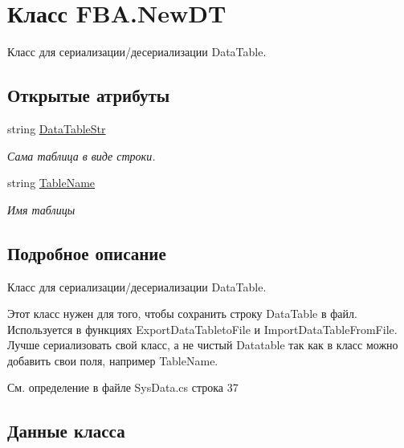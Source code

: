 \hypertarget{class_f_b_a_1_1_new_d_t}{}\section{Класс F\+B\+A.\+New\+DT}
\label{class_f_b_a_1_1_new_d_t}


Класс для сериализации/десериализации Data\+Table.  


\subsection*{Открытые атрибуты}
\begin{DoxyCompactItemize}
\item 
string \mbox{\hyperlink{class_f_b_a_1_1_new_d_t_a6750f5d837e710008598368fead17a90}{Data\+Table\+Str}}
\begin{DoxyCompactList}\small\item\em Сама таблица в виде строки. \end{DoxyCompactList}\item 
string \mbox{\hyperlink{class_f_b_a_1_1_new_d_t_a67b57ab947b18dd83e77f9499ab0d216}{Table\+Name}}
\begin{DoxyCompactList}\small\item\em Имя таблицы \end{DoxyCompactList}\end{DoxyCompactItemize}


\subsection{Подробное описание}
Класс для сериализации/десериализации Data\+Table. 

Этот класс нужен для того, чтобы сохранить строку Data\+Table в файл. Используется в функциях Export\+Data\+Tableto\+File и Import\+Data\+Table\+From\+File. Лучше сериализовать свой класс, а не чистый Datatable так как в класс можно добавить свои поля, например Table\+Name. ~\newline


См. определение в файле Sys\+Data.\+cs строка 37



\subsection{Данные класса}
\mbox{\label{class_f_b_a_1_1_new_d_t_a6750f5d837e710008598368fead17a90}} 
